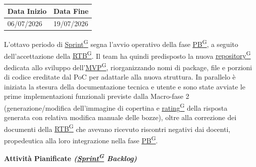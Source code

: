 \documentclass[a4paper,12pt]{article}
\newcounter{subsubsubsection}[subsubsection]
\providecommand{\glslink}[2]{\href{https://alittlebyte-19.github.io/Documentazione/glossario.html\#gls-#1}{\underline{#2}\textsuperscript{\scriptsize G}}}
\begin{document}

\label{sec:pb_ottavoperiodo}
\begin{table}[H]
    \centering
    \renewcommand{\arraystretch}{1.5}
    \begin{tabularx}{\textwidth}{|X|X|}
    \hline \rowcolor{Dandelion!50}
    \textbf{Data Inizio} & \textbf{Data Fine}\\
    \hline
    06/07/2026 & 19/07/2026\\
    \hline

    \end{tabularx}
\end{table}

L'ottavo periodo di \glslink{sprint}{Sprint} segna l'avvio operativo della fase \glslink{pb-product-baseline}{PB}, a seguito dell'accettazione della \glslink{rtb-requirements-and-technology-baseline}{RTB}. Il team ha quindi predisposto la nuova \glslink{repository}{repository} dedicata allo sviluppo dell'\glslink{mvp-minimum-viable-product}{MVP}, riorganizzando nomi di package, file e porzioni di codice ereditate dal PoC per adattarle alla nuova struttura. In parallelo è iniziata la stesura della documentazione tecnica e utente e sono state avviate le prime implementazioni funzionali previste dalla Macro-fase 2 (generazione/modifica dell'immagine di copertina e \glslink{rating}{rating} della risposta generata con relativa modifica manuale delle bozze), oltre alla correzione dei documenti della \glslink{rtb-requirements-and-technology-baseline}{RTB} che avevano ricevuto riscontri negativi dai docenti, propedeutica alla loro integrazione nella fase \glslink{pb-product-baseline}{PB}.

\begin{center}
\noindent\textbf{Attività Pianificate \textit{(\glslink{sprint}{Sprint} Backlog)}}\\
\end{center}
\end{document}
